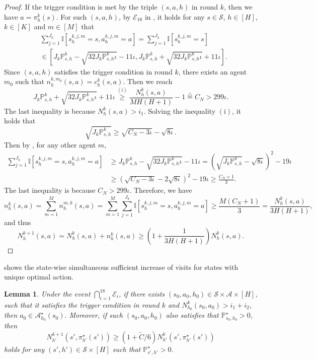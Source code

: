 \documentclass{article}
\newtheorem{lemma}{Lemma}[section]
\newcommand{\sah}{\mathcal{S} \times \mathcal{A} \times [H]}
\begin{document}
\begin{proof}
If the trigger condition is met by the triple $(s,a,h)$ in round $k$, then we have $a =\pi_h^k(s)$. For such $(s,a,h)$, by $\mathcal{E}_{18}$ in , it holds for any $s \in \mathcal{S}$, $h \in [H]$, $k \in [K]$ and $m \in [M]$ that
    \begin{align}
        \label{visitlow}
        &\sum_{j = 1}^{J_k}\mathbb{I}\left[s_{h}^{k,j,m} = s, a_{h}^{k,j,m} = a\right] = \sum_{j = 1}^{J_k}\mathbb{I}\left[s_{h}^{k,j,m} = s\right] \nonumber\\
        &\in \left[J_k\mathbb{P}_{s,h}^{k} - \sqrt{32J_k\mathbb{P}_{s,h}^{k}\iota} - 11\iota, J_k\mathbb{P}_{s,h}^{k} +\sqrt{32J_k\mathbb{P}_{s,h}^{k}\iota} + 11\iota\right].
    \end{align}
    Since $(s,a,h)$ satisfies the trigger condition in round $k$, there exists an agent $m_0$ such that $n_h^{k,m_0}(s,a) = c_h^k(s,a)$. Then we reach
    $$J_k\mathbb{P}_{s,h}^{k} +\sqrt{32J_k\mathbb{P}_{s,h}^{k}\iota} + 11\iota \overset{(\mathrm{i})}{\geq} \frac{N_h^k(s,a)}{MH(H+1)} -1\overset{\triangle}{=} C_N> 299 \iota.$$
    The last inequality is because $N_h^k(s,a) > i_1$. Solving the inequality $(\mathrm{i})$, it holds that
    $$\sqrt{J_k\mathbb{P}_{s,h}^{k}} \geq \sqrt{C_N-3\iota} -\sqrt{8\iota}.$$
    Then by , for any other agent $m$,
    \begin{align*}
        \sum_{j = 1}^{J_k}\mathbb{I}\left[s_{h}^{k,j,m} = s, a_{h}^{k,j,m} = a \right] &\geq J_k\mathbb{P}_{s,h}^{k} - \sqrt{32J_k\mathbb{P}_{s,h}^{k}\iota} -11\iota = \left(\sqrt{J_k\mathbb{P}_{s,h}^{k}} -\sqrt{8\iota}\right)^2- 19\iota  \nonumber\\
        &\geq \left(\sqrt{C_N-3\iota} -2\sqrt{8\iota}\right)^2 -19\iota \geq \frac{C_N+1}{3}.
    \end{align*}
    The last inequality is because $C_N > 299 \iota$. Therefore, we have
    $$n_h^k(s,a) = \sum_{m=1}^Mn_h^{m,k}(s,a) = \sum_{m=1}^M \sum_{j = 1}^{J_k}\mathbb{I}\left[s_{h}^{k,j,m} = s, a_{h}^{k,j,m} = a\right] \geq \frac{M(C_N+1)}{3} = \frac{N_h^k(s,a)}{3H(H+1)},$$
    and thus
    $$N_h^{k+1}(s,a) = N_h^k(s,a) + n_h^k(s,a) \geq \left(1 +\frac{1}{3H(H+1)}\right)N_h^k(s,a).$$
\end{proof}
 shows the state-wise simultaneous sufficient increase of visits for states with unique optimal action.
\begin{lemma}
    \label{1smallN2}   
    Under the event $\bigcap_{i=1}^{18}\mathcal{E}_i$, if there exists $(s_0,a_0,h_0)\in \sah$, such that it satisfies the trigger condition in round $k$ and $N_{h_0}^k(s_0,a_0) > i_1+i_2$, then $a_0 \in \mathcal{A}_{h_0}^{\star}(s_0).$ Moreover, if such $(s_0,a_0,h_0)$ also satisfies that $\mathbb{P}_{s_0,h_0}^{\star} > 0$, then 
        $$N_{h'}^{k+1}(s',\pi_{h'}^{\star}(s')) \geq (1 +\tilde{C}/6)N_{h'}^k(s',\pi_{h'}^{\star}(s'))$$
    holds for any $(s',h')\in\mathcal{S} \times [H]$ such that $\mathbb{P}_{s',h'}^{\star} > 0$. 
    \end{lemma}
\end{document}
